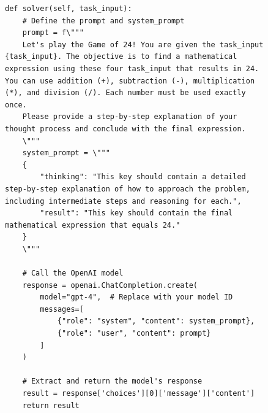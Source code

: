 \documentclass[11pt]{article}
\begin{document}
\begin{figure}[ht]
\begin{lstlisting}[style=pythonstyle, caption={Initial code based on Chain-of-Thought for Game of 24.}]
def solver(self, task_input):
    # Define the prompt and system_prompt
    prompt = f\"""
    Let's play the Game of 24! You are given the task_input {task_input}. The objective is to find a mathematical expression using these four task_input that results in 24. You can use addition (+), subtraction (-), multiplication (*), and division (/). Each number must be used exactly once. 
    Please provide a step-by-step explanation of your thought process and conclude with the final expression.
    \"""
    system_prompt = \"""
    {
        "thinking": "This key should contain a detailed step-by-step explanation of how to approach the problem, including intermediate steps and reasoning for each.",
        "result": "This key should contain the final mathematical expression that equals 24."
    }
    \"""

    # Call the OpenAI model
    response = openai.ChatCompletion.create(
        model="gpt-4",  # Replace with your model ID
        messages=[
            {"role": "system", "content": system_prompt},
            {"role": "user", "content": prompt}
        ]
    )

    # Extract and return the model's response
    result = response['choices'][0]['message']['content']
    return result
\end{lstlisting}
\end{figure}
\end{document}

